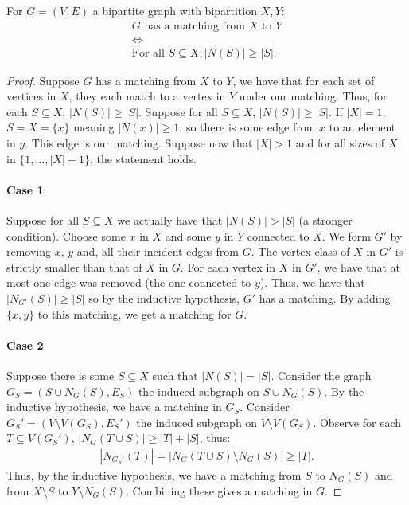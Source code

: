 For $G = (V, E)$ a bipartite graph with bipartition $X, Y$: \begin{gather*}
  G \text{ has a matching from } X \text{ to } Y \\
  \Longleftrightarrow \\
  \text{For all } S \subseteq X, |N(S)| \geq |S|.
\end{gather*}
\begin{proof}
    Suppose $G$ has a matching from $X$ to $Y$, we have that
    for each set of vertices in $X$, they each match to a
    vertex in $Y$ under our matching. Thus, for each $S \subseteq X$,
    $|N(S)| \geq |S|$. Suppose for all $S \subseteq X$, 
    $|N(S)| \geq |S|$. If $|X| = 1$, $S = X = \{x\}$ meaning
    $|N(x)| \geq 1$, so there is some edge from $x$ to an
    element in $y$. This edge is our matching.
    Suppose now that $|X| > 1$ and for all sizes of $X$ in
    $\{1, \ldots, |X| - 1\}$, the statement holds.
    \paragraph{Case 1}
    Suppose for all $S \subseteq X$ we actually have that 
    $|N(S)| > |S|$ (a stronger condition). Choose some
    $x$ in $X$ and some $y$ in $Y$ connected to $X$. We
    form $G'$ by removing $x$, $y$ and, all their incident
    edges from $G$. The vertex class of $X$ in $G'$
    is strictly smaller than that of $X$ in $G$. For
    each vertex in $X$ in $G'$, we have that at most
    one edge was removed (the one connected to $y$).
    Thus, we have that $|N_{G'}(S)| \geq |S|$ so by the
    inductive hypothesis, $G'$ has a matching. By adding
    $\{x, y\}$ to this matching, we get a matching for $G$.
    \paragraph{Case 2}
    Suppose there is some $S \subseteq X$ such that $|N(S)| = |S|$.
    Consider the graph $G_S = (S \cup N_G(S), E_S)$ the induced
    subgraph on $S \cup N_G(S)$. By the inductive hypothesis,
    we have a matching in $G_S$. Consider 
    $G_S' = (V \setminus V(G_S), E_S')$ the induced subgraph on
    $V \setminus V(G_S)$. Observe for each $T \subseteq V(G_S')$,
    $|N_G(T \cup S)| \geq |T| + |S|$, thus: \begin{gather*}
        |N_{G_S'}(T)| = |N_G(T \cup S) \setminus N_G(S)| \geq |T|.
    \end{gather*} Thus, by the inductive hypothesis, we have a matching
    from $S$ to $N_G(S)$ and from $X \setminus S$ to $Y \setminus N_G(S)$.
    Combining these gives a matching in $G$. 
\end{proof}

